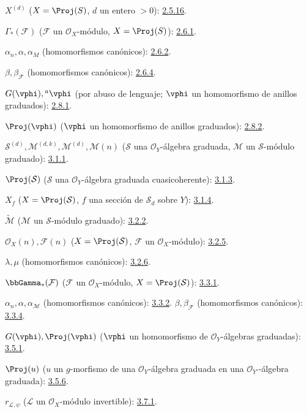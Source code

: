 \documentclass[oneside,10pt]{amsart}
\newcommand{\oldpage}[2][]{\marginnote{\normalfont\footnotesize\textbf{#1}~|~#2}\ignorespaces}
\begin{document}
$X^{(d)}$ ($X=\Proj(S)$, $d$ un entero $>0$): \hyperref[II.2.5.16-fr]{2.5.16}.

$\Gamma_*(\mathcal{F})$ ($\mathcal{F}$ un $\mathcal{O}_X$-módulo,
$X=\Proj(S)$): \hyperref[II.2.6.1-fr]{2.6.1}.

$\alpha_n,\alpha,\alpha_M$ (homomorfismos canónicos): \hyperref[II.2.6.2-fr]{2.6.2}.

$\beta,\beta_{\mathcal{F}}$ (homomorfismos canónicos): \hyperref[II.2.6.4-fr]{2.6.4}.

$G(\vphi),{}^a\vphi$ (por abuso de lenguaje;
$\vphi$ un homomorfismo de anillos graduados): \hyperref[II.2.8.1-fr]{2.8.1}.

$\Proj(\vphi)$ ($\vphi$ un homomorfismo de anillos graduados): \hyperref[II.2.8.2-fr]{2.8.2}.

$\mathcal{S}^{(d)},\mathcal{M}^{(d,k)},\mathcal{M}^{(d)},\mathcal{M}(n)$
($\mathcal{S}$ una $\mathcal{O}_Y$-álgebra graduada,
$\mathcal{M}$ un $\mathcal{S}$-módulo graduado): \hyperref[II.3.1.1-fr]{3.1.1}.

$\Proj(\mathcal{S})$ ($\mathcal{S}$ una $\mathcal{O}_Y$-álgebra graduada cuasicoherente): \hyperref[II.3.1.3-fr]{3.1.3}.

$X_f$ ($X=\Proj(\mathcal{S})$, $f$ una sección de $\mathcal{S}_d$ sobre $Y$): \hyperref[II.3.1.4-fr]{3.1.4}.

$\widetilde{\mathcal{M}}$ ($\mathcal{M}$ un $\mathcal{S}$-módulo graduado): \hyperref[II.3.2.2-fr]{3.2.2}.

$\mathcal{O}_X(n),\mathcal{F}(n)$
($X=\Proj(\mathcal{S})$, $\mathcal{F}$ un $\mathcal{O}_X$-módulo): \hyperref[II.3.2.5-fr]{3.2.5}.

$\lambda,\mu$ (homomorfismos canónicos): \hyperref[II.3.2.6-fr]{3.2.6}.

$\bbGamma_*(\mathcal{F})$ ($\mathcal{F}$ un $\mathcal{O}_X$-módulo,
$X=\Proj(\mathcal{S})$): \hyperref[II.3.3.1-fr]{3.3.1}.

$\alpha_n,\alpha,\alpha_{\mathcal{M}}$ (homomorfismos canónicos): \hyperref[II.3.3.2-fr]{3.3.2}.
\oldpage[II]{208}
$\beta,\beta_{\mathcal{F}}$ (homomorfismos canónicos): \hyperref[II.3.3.4-fr]{3.3.4}.

$G(\vphi),\Proj(\vphi)$
($\vphi$ un homomorfismo de $\mathcal{O}_Y$-álgebras graduadas): \hyperref[II.3.5.1-fr]{3.5.1}.

$\Proj(u)$ ($u$ un $g$-morfismo de una $\mathcal{O}_Y$-álgebra graduada
en una $\mathcal{O}_{Y'}$-álgebra graduada): \hyperref[II.3.5.6-fr]{3.5.6}.

$r_{\mathcal{L},\psi}$ ($\mathcal{L}$ un $\mathcal{O}_X$-módulo invertible): \hyperref[II.3.7.1-fr]{3.7.1}.
\end{document}
